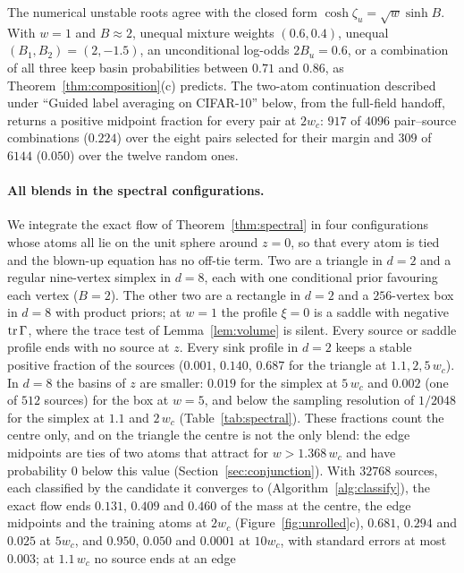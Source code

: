 \documentclass{article} %
\theoremstyle{plain}
\theoremstyle{definition}
\theoremstyle{remark}
\begin{document}
The numerical unstable roots agree with the closed form $\cosh \zeta_u=\sqrt w\sinh B$.
With $w=1$ and $B\approx2$, unequal mixture weights $(0.6,0.4)$, unequal $(B_1,B_2)=(2,-1.5)$, an
unconditional log-odds $2B_u=0.6$, or a combination of all three keep basin probabilities between
$0.71$ and $0.86$, as Theorem~\ref{thm:composition}(c) predicts.
The two-atom continuation described under ``Guided label averaging on CIFAR-10'' below, from the full-field handoff, returns a positive midpoint fraction for every
pair at $2w_c$: $917$ of $4096$ pair--source combinations ($0.224$) over the eight pairs selected
for their margin and $309$ of $6144$ ($0.050$) over the twelve random ones.

\paragraph{All blends in the spectral configurations.} We integrate the exact flow of
Theorem~\ref{thm:spectral} in four configurations whose atoms all lie on the unit sphere around
$z=0$, so that every atom is tied and the blown-up equation has no off-tie term. Two are a
triangle in $d=2$ and a regular nine-vertex simplex in $d=8$, each with one conditional prior
favouring each vertex ($B=2$). The other two are a rectangle in $d=2$ and a $256$-vertex box in
$d=8$ with product priors; at $w=1$ the profile $\xi=0$ is a saddle with negative $\operatorname{tr}\Gamma$,
where the trace test of Lemma~\ref{lem:volume} is silent. Every source or saddle profile ends
with no source at $z$. Every sink profile in $d=2$ keeps a stable positive fraction of the sources
($0.001$, $0.140$, $0.687$ for the triangle at $1.1,2,5\,w_c$). In $d=8$ the basins of $z$ are
smaller: $0.019$ for the simplex at $5\,w_c$ and $0.002$ (one of $512$ sources) for the box at
$w=5$, and below the sampling resolution of $1/2048$ for the simplex at $1.1$ and $2\,w_c$
(Table~\ref{tab:spectral}). These fractions count the
centre only, and on the triangle the centre is not the only blend: the edge midpoints are ties of
two atoms that attract for $w>1.368\,w_c$ and have probability $0$ below this value
(Section~\ref{sec:conjunction}). With $32768$ sources, each classified by the candidate it
converges to (Algorithm~\ref{alg:classify}), the exact flow ends $0.131$, $0.409$ and
$0.460$ of the mass at the centre, the edge midpoints and the training atoms at $2w_c$
(Figure~\ref{fig:unrolled}c), $0.681$, $0.294$ and $0.025$ at $5w_c$, and $0.950$, $0.050$ and
$0.0001$ at $10w_c$, with standard errors at most $0.003$; at $1.1\,w_c$ no source ends at an edge
\end{document}

